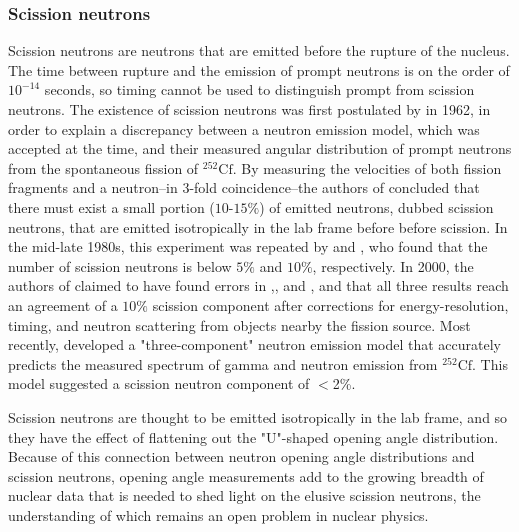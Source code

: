 \subsubsection{Scission neutrons} 
Scission neutrons are neutrons that are emitted before the rupture of the nucleus. The time between rupture and the emission of prompt neutrons is on the order of $10^{-14}$ seconds, so timing cannot be used to distinguish prompt from scission neutrons. The existence of scission neutrons was first postulated by \cite{Bowman} in 1962, in order to explain a discrepancy between a neutron emission model, which was accepted at the time, and their measured angular distribution of prompt neutrons from the spontaneous fission of $^{252}\text{Cf}$. By measuring the velocities of both fission fragments and a neutron--in 3-fold coincidence--the authors of \cite{Bowman} concluded that there must exist a small portion ($\text{10-15\%}$) of emitted neutrons, dubbed scission neutrons, that are emitted isotropically in the lab frame before before scission. In the mid-late 1980s, this experiment was repeated by \cite{seregina1985} and \cite{JORGENSEN}, who found that the number of scission neutrons is below $5\%$ and $10\%$, respectively. In 2000, the authors of \cite{KORNILOV2001} claimed to have found errors in \cite{Bowman},\cite{JORGENSEN}, and \cite{seregina1985}, and that all three results reach an agreement of a $10\%$ scission component after corrections for energy-resolution, timing, and neutron scattering from objects nearby the fission source. Most recently, \cite{serot2017influence} developed a "three-component" neutron emission model that accurately predicts the measured spectrum of gamma and neutron emission from $^{252}\text{Cf}$. This model suggested a scission neutron component of $<$2\%.

Scission neutrons are thought to be emitted isotropically in the lab frame, and so they have the effect of flattening out the "U"-shaped opening angle distribution. Because of this connection between neutron opening angle distributions and scission neutrons, opening angle measurements add to the growing breadth of nuclear data that is needed to shed light on the elusive scission neutrons, the understanding of which remains an open problem in nuclear physics.

